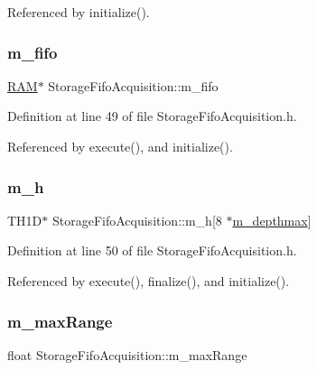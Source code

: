 Referenced by initialize().

\mbox{\label{classStorageFifoAcquisition_a5405a161dc3983274ccdfdf83687d98d}} 
\subsubsection{\texorpdfstring{m\+\_\+fifo}{m\_fifo}}
{\footnotesize\ttfamily \hyperlink{classRAM}{R\+AM}$\ast$ Storage\+Fifo\+Acquisition\+::m\+\_\+fifo\hspace{0.3cm}{\ttfamily [private]}}



Definition at line 49 of file Storage\+Fifo\+Acquisition.\+h.



Referenced by execute(), and initialize().

\mbox{\label{classStorageFifoAcquisition_a19913cfc87da82b107e49399e3e9b754}} 
\subsubsection{\texorpdfstring{m\+\_\+h}{m\_h}}
{\footnotesize\ttfamily T\+H1D$\ast$ Storage\+Fifo\+Acquisition\+::m\+\_\+h\mbox{[}8 $\ast$\hyperlink{classStorageFifoAcquisition_a2f3ce0569ee9ec4fa78ec66a9cbe6ed7}{m\+\_\+depthmax}\mbox{]}\hspace{0.3cm}{\ttfamily [private]}}



Definition at line 50 of file Storage\+Fifo\+Acquisition.\+h.



Referenced by execute(), finalize(), and initialize().

\mbox{\label{classStorageFifoAcquisition_adbe54adb957ea13ae6ff9e56b7e398c8}} 
\subsubsection{\texorpdfstring{m\+\_\+max\+Range}{m\_maxRange}}
{\footnotesize\ttfamily float Storage\+Fifo\+Acquisition\+::m\+\_\+max\+Range\hspace{0.3cm}{\ttfamily [private]}}



